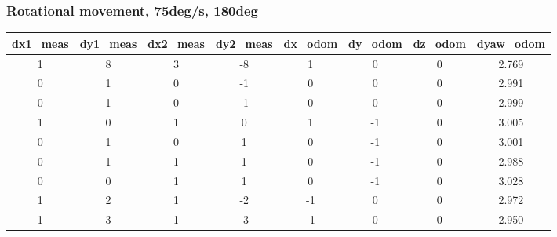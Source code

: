 \documentclass[a4paper, 12pt]{article}
\begin{document}
    \subsubsection{Rotational movement, 75deg/s, 180deg}

    \begin{table}[H]
    \scriptsize
    \begin{tabular}{@{}cccccccc@{}}
    \toprule
    \textbf{dx1\_meas} & \textbf{dy1\_meas} & \textbf{dx2\_meas} & \textbf{dy2\_meas} & \textbf{dx\_odom} & \textbf{dy\_odom} & \textbf{dz\_odom} & \textbf{dyaw\_odom} \\ \midrule
    1                      & 8                      & 3                      & -8                     & 1                 & 0                 & 0                 & 2.769               \\
    0                      & 1                      & 0                      & -1                     & 0                 & 0                 & 0                 & 2.991               \\
    0                      & 1                      & 0                      & -1                     & 0                 & 0                 & 0                 & 2.999               \\
    1                      & 0                      & 1                      & 0                      & 1                 & -1                & 0                 & 3.005               \\
    0                      & 1                      & 0                      & 1                      & 0                 & -1                & 0                 & 3.001               \\
    0                      & 1                      & 1                      & 1                      & 0                 & -1                & 0                 & 2.988               \\
    0                      & 0                      & 1                      & 1                      & 0                 & -1                & 0                 & 3.028               \\
    1                      & 2                      & 1                      & -2                     & -1                & 0                 & 0                 & 2.972               \\
    1                      & 3                      & 1                      & -3                     & -1                & 0                 & 0                 & 2.950               \\

\end{tabular}
\end{table}
\end{document}
